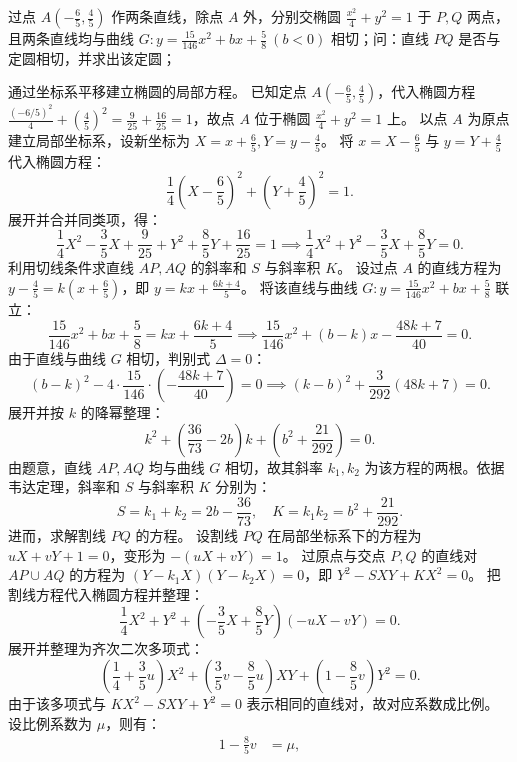 \begin{example}
过点 \(A\left(-\frac{6}{5},\frac{4}{5}\right)\) 作两条直线，除点 \(A\) 外，分别交椭圆 \(\frac{x^2}{4} + y^2 = 1\) 于 \(P,Q\) 两点，且两条直线均与曲线 \(G: y = \frac{15}{146}x^2 + bx + \frac{5}{8}\ (b < 0)\) 相切；问：直线 \(PQ\) 是否与定圆相切，并求出该定圆；
\end{example}
\begin{solution}
通过坐标系平移建立椭圆的局部方程。
已知定点 $A\left(-\frac{6}{5}, \frac{4}{5}\right)$，代入椭圆方程 $\frac{(-6/5)^2}{4} + \left(\frac{4}{5}\right)^2 = \frac{9}{25} + \frac{16}{25} = 1$，故点 $A$ 位于椭圆 $\frac{x^2}{4} + y^2 = 1$ 上。
以点 $A$ 为原点建立局部坐标系，设新坐标为 $X = x + \frac{6}{5}, Y = y - \frac{4}{5}$。
将 $x = X - \frac{6}{5}$ 与 $y = Y + \frac{4}{5}$ 代入椭圆方程：
\[ \frac{1}{4}\left(X - \frac{6}{5}\right)^2 + \left(Y + \frac{4}{5}\right)^2 = 1. \]
展开并合并同类项，得：
\[ \frac{1}{4}X^2 - \frac{3}{5}X + \frac{9}{25} + Y^2 + \frac{8}{5}Y + \frac{16}{25} = 1 \implies \frac{1}{4}X^2 + Y^2 - \frac{3}{5}X + \frac{8}{5}Y = 0. \]
利用切线条件求直线 $AP, AQ$ 的斜率和 $S$ 与斜率积 $K$。
设过点 $A$ 的直线方程为 $y - \frac{4}{5} = k\left(x + \frac{6}{5}\right)$，即 $y = kx + \frac{6k+4}{5}$。
将该直线与曲线 $G: y = \frac{15}{146}x^2 + bx + \frac{5}{8}$ 联立：
\[ \frac{15}{146}x^2 + bx + \frac{5}{8} = kx + \frac{6k+4}{5} \implies \frac{15}{146}x^2 + (b-k)x - \frac{48k+7}{40} = 0. \]
由于直线与曲线 $G$ 相切，判别式 $\Delta = 0$：
\[ (b-k)^2 - 4 \cdot \frac{15}{146} \cdot \left(-\frac{48k+7}{40}\right) = 0 \implies (k-b)^2 + \frac{3}{292}(48k+7) = 0. \]
展开并按 $k$ 的降幂整理：
\[ k^2 + \left(\frac{36}{73} - 2b\right)k + \left(b^2 + \frac{21}{292}\right) = 0. \]
由题意，直线 $AP, AQ$ 均与曲线 $G$ 相切，故其斜率 $k_1, k_2$ 为该方程的两根。依据韦达定理，斜率和 $S$ 与斜率积 $K$ 分别为：
\[ S = k_1 + k_2 = 2b - \frac{36}{73}, \quad K = k_1 k_2 = b^2 + \frac{21}{292}. \]
进而，求解割线 $PQ$ 的方程。
设割线 $PQ$ 在局部坐标系下的方程为 $uX + vY + 1 = 0$，变形为 $-(uX + vY) = 1$。
过原点与交点 $P, Q$ 的直线对 $AP \cup AQ$ 的方程为 $(Y - k_1 X)(Y - k_2 X) = 0$，即 $Y^2 - SXY + KX^2 = 0$。
把割线方程代入椭圆方程并整理：
\[ \frac{1}{4}X^2 + Y^2 + \left(-\frac{3}{5}X + \frac{8}{5}Y\right)(-uX - vY) = 0. \]
展开并整理为齐次二次多项式：
\[ \left(\frac{1}{4} + \frac{3}{5}u\right)X^2 + \left(\frac{3}{5}v - \frac{8}{5}u\right)XY + \left(1 - \frac{8}{5}v\right)Y^2 = 0. \]
由于该多项式与 $KX^2 - SXY + Y^2 = 0$ 表示相同的直线对，故对应系数成比例。设比例系数为 $\mu$，则有：
\begin{align*}
1 - \frac{8}{5}v &= \mu, \\

\end{align*}
\end{solution}
